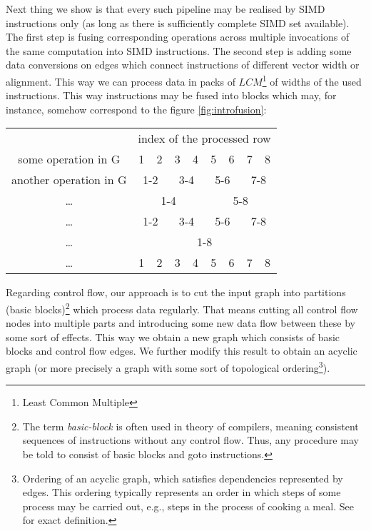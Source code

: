   
Next thing we show is that every such pipeline may be realised by SIMD instructions only (as long as there is sufficiently complete SIMD set available). The first step is fusing corresponding operations across multiple invocations of the same computation into SIMD instructions. The second step is adding some data conversions on edges which connect instructions of different vector width or alignment. This way we can process data in packs of $LCM$\footnote{Least Common Multiple} of widths of the used instructions. This way instructions may be fused into blocks which may, for instance, somehow correspond to the figure \ref{fig:introfusion}:

\mybeginfig
\begin{center}
  \begin{tabular}{c|c|c|c|c|c|c|c|c|}
    \cline{2-9}
    & \multicolumn{8}{c|}{index of the processed row}\\
    \cline{2-9}
    some operation in G & 1 & 2 & 3 & 4 & 5 & 6 & 7 & 8 \\
    \cline{2-9}
    another operation in G & \multicolumn{2}{c|}{1-2} & \multicolumn{2}{c|}{3-4} & \multicolumn{2}{c|}{5-6} & \multicolumn{2}{c|}{7-8} \\
    \cline{2-9}
    \dots & \multicolumn{4}{c|}{1-4} & \multicolumn{4}{c|}{5-8}\\
    \cline{2-9}
    \dots & \multicolumn{2}{c|}{1-2} & \multicolumn{2}{c|}{3-4} & \multicolumn{2}{c|}{5-6} & \multicolumn{2}{c|}{7-8}\\
    \cline{2-9}
    \dots & \multicolumn{8}{c|}{1-8} \\
    \cline{2-9}
    \dots & 1 & 2 & 3 & 4 & 5 & 6 & 7 & 8\\
    \cline{2-9}
  \end{tabular}
\end{center}


  Regarding control flow, our approach is to cut the input graph into partitions (basic blocks)\footnote{The term \emph{basic-block} is often used in theory of compilers, meaning consistent sequences of instructions without any control flow. Thus, any procedure may be told to consist of basic blocks and goto instructions.} which process data regularly. That means cutting all control flow nodes into multiple parts and introducing some new data flow between these by some sort of effects. This way we obtain a new graph which consists of basic blocks and control flow edges. We further modify this result to obtain an acyclic graph (or more precisely a graph with some sort of topological ordering\footnote{Ordering of an acyclic graph, which satisfies dependencies represented by edges. This ordering typically represents an order in which steps of some process may be carried out, e.g., steps in the process of cooking a meal. See \cite{kapitoly} for exact definition.}). 

